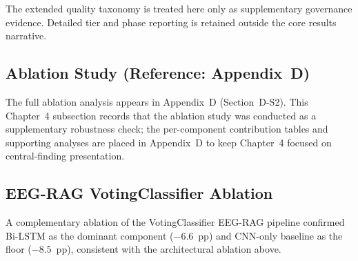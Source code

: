 The extended quality taxonomy is treated here only as supplementary governance evidence. Detailed tier and phase reporting is retained outside the core results narrative.


\iffalse %

\fi



\subsection{Ablation Study (Reference: Appendix~D)}

\noindent The full ablation analysis appears in Appendix~D (Section~D-S2). This Chapter~4 subsection records that the ablation study was conducted as a supplementary robustness check; the per-component contribution tables and supporting analyses are placed in Appendix~D to keep Chapter~4 focused on central-finding presentation.



\iffalse
\subsection{EEG-RAG VotingClassifier Ablation}
\iffalse %
A complementary ablation of the VotingClassifier EEG-RAG pipeline confirmed Bi-LSTM as the dominant component ($-6.6$~pp) and CNN-only baseline as the floor ($-8.5$~pp), consistent with the architectural ablation above.

